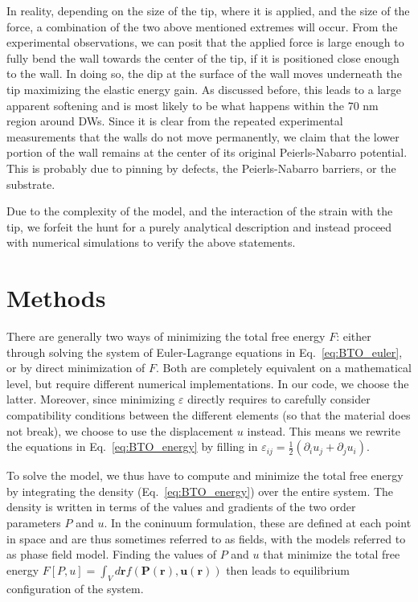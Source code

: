 In reality, depending on the size of the tip, where it is applied, and the size of the force, a combination of the two above mentioned extremes will occur.
From the experimental observations, we can posit that the applied force is large enough to fully bend the wall towards the center of the tip, if it is positioned close enough to the wall.
In doing so, the dip at the surface of the wall moves underneath the tip maximizing the elastic energy gain.
As discussed before, this leads to a large apparent softening and is most likely to be what happens within the 70 nm region around DWs.
Since it is clear from the repeated experimental measurements that the walls do not move permanently, we claim that the lower portion of the wall remains at the center of its original Peierls-Nabarro potential.
This is probably due to pinning by defects, the Peierls-Nabarro barriers, or the substrate.

Due to the complexity of the model, and the interaction of the strain with the tip, we forfeit the hunt for a purely analytical description and instead proceed with numerical simulations to verify the above statements.

\section{Methods}
There are generally two ways of minimizing the total free energy $F$: either through solving the system of Euler-Lagrange equations in Eq.~\ref{eq:BTO_euler}, or by direct minimization of $F$.
Both are completely equivalent on a mathematical level, but require different numerical implementations.
In our code, we choose the latter.
Moreover, since minimizing $\varepsilon$ directly requires to carefully consider compatibility conditions between the different elements (so that the material does not break)\cite{Marton2007}, we choose to use the displacement $u$ instead.
This means we rewrite the equations in Eq.~\ref{eq:BTO_energy} by filling in $\varepsilon_{ij} = \frac{1}{2}(\partial_i u_j + \partial_j u_i)$.

To solve the model, we thus have to compute and minimize the total free energy by integrating the density (Eq.~\ref{eq:BTO_energy}) over the entire system.
The density is written in terms of the values and gradients of the two order parameters $P$ and $u$.
In the coninuum formulation, these are defined at each point in space and are thus sometimes referred to as fields, with the models referred to as phase field model.
Finding the values of $P$ and $u$ that minimize the total free energy $F[P,u]=\int_V d\bm{r} f(\bm{P}(\bm{r}),\bm{u}(\bm{r}))$ then leads to equilibrium configuration of the system.

